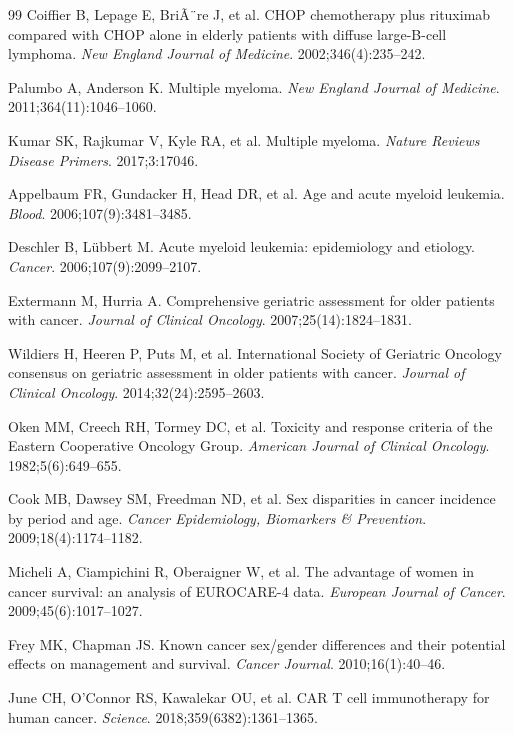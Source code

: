 ﻿\documentclass[12pt,a4paper]{article}
\theoremstyle{definition}
\begin{document}
\begin{thebibliography}{99}
  Coiffier B, Lepage E, BriÃ¨re J, et al.
  CHOP chemotherapy plus rituximab compared with CHOP alone in elderly patients
  with diffuse large-B-cell lymphoma.
  \textit{New England Journal of Medicine}. 2002;346(4):235--242.

  Palumbo A, Anderson K.
  Multiple myeloma.
  \textit{New England Journal of Medicine}. 2011;364(11):1046--1060.

  Kumar SK, Rajkumar V, Kyle RA, et al.
  Multiple myeloma.
  \textit{Nature Reviews Disease Primers}. 2017;3:17046.

  Appelbaum FR, Gundacker H, Head DR, et al.
  Age and acute myeloid leukemia.
  \textit{Blood}. 2006;107(9):3481--3485.

  Deschler B, Lübbert M.
  Acute myeloid leukemia: epidemiology and etiology.
  \textit{Cancer}. 2006;107(9):2099--2107.

  Extermann M, Hurria A.
  Comprehensive geriatric assessment for older patients with cancer.
  \textit{Journal of Clinical Oncology}. 2007;25(14):1824--1831.

  Wildiers H, Heeren P, Puts M, et al.
  International Society of Geriatric Oncology consensus on geriatric assessment
  in older patients with cancer.
  \textit{Journal of Clinical Oncology}. 2014;32(24):2595--2603.

  Oken MM, Creech RH, Tormey DC, et al.
  Toxicity and response criteria of the Eastern Cooperative Oncology Group.
  \textit{American Journal of Clinical Oncology}. 1982;5(6):649--655.

  Cook MB, Dawsey SM, Freedman ND, et al.
  Sex disparities in cancer incidence by period and age.
  \textit{Cancer Epidemiology, Biomarkers \& Prevention}. 2009;18(4):1174--1182.

  Micheli A, Ciampichini R, Oberaigner W, et al.
  The advantage of women in cancer survival: an analysis of EUROCARE-4 data.
  \textit{European Journal of Cancer}. 2009;45(6):1017--1027.

  Frey MK, Chapman JS.
  Known cancer sex/gender differences and their potential effects on management
  and survival.
  \textit{Cancer Journal}. 2010;16(1):40--46.

  June CH, O'Connor RS, Kawalekar OU, et al.
  CAR T cell immunotherapy for human cancer.
  \textit{Science}. 2018;359(6382):1361--1365.


\end{thebibliography}
\end{document}
